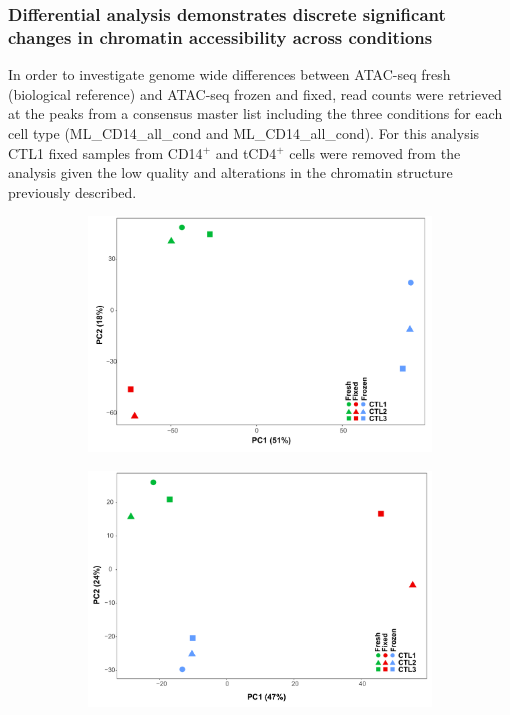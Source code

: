 \subsubsection{Differential analysis demonstrates discrete significant changes in chromatin accessibility across conditions}
In order to investigate genome wide differences between ATAC-seq fresh (biological reference) and ATAC-seq frozen and fixed, read counts were retrieved at the peaks from a consensus master list including the three conditions for each cell type (ML\_CD14\_all\_cond and ML\_CD14\_all\_cond). For this analysis CTL1 fixed samples from CD14$^+$ and tCD4$^+$ cells were removed from the analysis given the low quality and alterations in the chromatin structure previously described. 
     
\begin{figure}[htbp]
\centering
\begin{subfigure}{0.5\textwidth}
\centering
\includegraphics[width=\textwidth]{./Results1/pdfs/Core_ATAC_CD14_fresh_frozen_fixed_no_CTL1_fixed_PCA}
\caption{\textbf{}}
\end{subfigure}%
\begin{subfigure}{0.5\textwidth}
\centering
\includegraphics[width=\textwidth]{./Results1/pdfs/Core_ATAC_CD4_fresh_frozen_fixed_no_CTL1_fixed_PCA}

\end{subfigure}
\end{figure}
